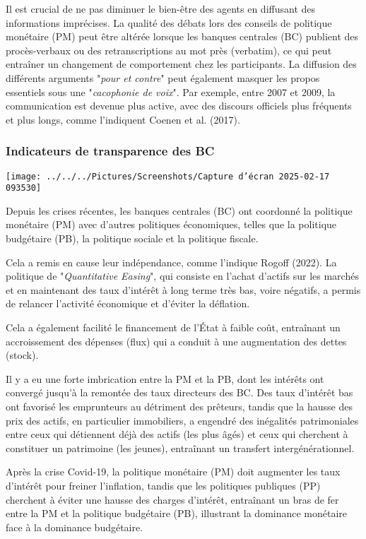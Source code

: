 \documentclass[a4paper, 12pt]{report}
\begin{document}
Il est crucial de ne pas diminuer le bien-être des agents en diffusant des informations imprécises. La qualité des débats lors des conseils de politique monétaire (PM) peut être altérée lorsque les banques centrales (BC) publient des procès-verbaux ou des retranscriptions au mot près (verbatim), ce qui peut entraîner un changement de comportement chez les participants. La diffusion des différents arguments "\textit{pour et contre}" peut également masquer les propos essentiels sous une "\textit{cacophonie de voix}". Par exemple, entre 2007 et 2009, la communication est devenue plus active, avec des discours officiels plus fréquents et plus longs, comme l'indiquent Coenen et al. (2017).

\subsubsection{Indicateurs de transparence des BC}

\begin{center}
	\texttt{[image: ../../../Pictures/Screenshots/Capture d'écran 2025-02-17 093530]}
\end{center}

Depuis les crises récentes, les banques centrales (BC) ont coordonné la politique monétaire (PM) avec d'autres politiques économiques, telles que la politique budgétaire (PB), la politique sociale et la politique fiscale. 

Cela a remis en cause leur indépendance, comme l'indique Rogoff (2022). La politique de "\textit{Quantitative Easing}", qui consiste en l'achat d'actifs sur les marchés et en maintenant des taux d'intérêt à long terme très bas, voire négatifs, a permis de relancer l'activité économique et d'éviter la déflation. 

Cela a également facilité le financement de l'État à faible coût, entraînant un accroissement des dépenses (flux) qui a conduit à une augmentation des dettes (stock). 

Il y a eu une forte imbrication entre la PM et la PB, dont les intérêts ont convergé jusqu'à la remontée des taux directeurs des BC. Des taux d'intérêt bas ont favorisé les emprunteurs au détriment des prêteurs, tandis que la hausse des prix des actifs, en particulier immobiliers, a engendré des inégalités patrimoniales entre ceux qui détiennent déjà des actifs (les plus âgés) et ceux qui cherchent à constituer un patrimoine (les jeunes), entraînant un transfert intergénérationnel.

Après la crise Covid-19, la politique monétaire (PM) doit augmenter les taux d'intérêt pour freiner l'inflation, tandis que les politiques publiques (PP) cherchent à éviter une hausse des charges d'intérêt, entraînant un bras de fer entre la PM et la politique budgétaire (PB), illustrant la dominance monétaire face à la dominance budgétaire. 
\end{document}
